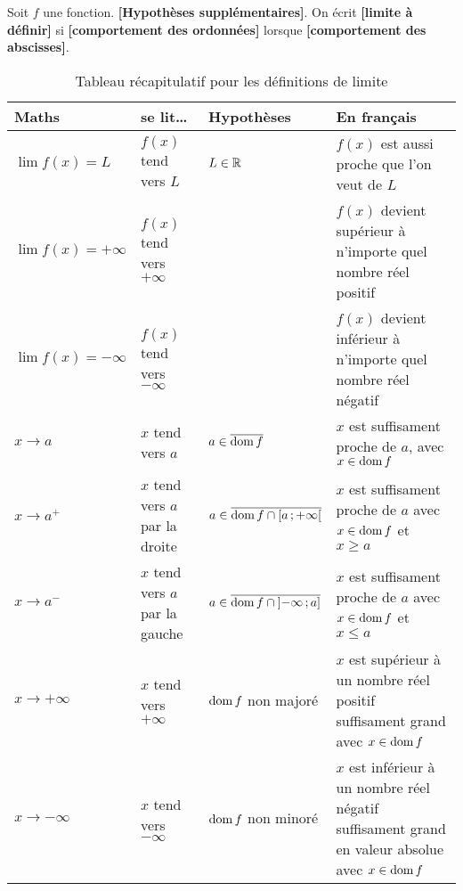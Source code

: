 \documentclass[main.tex]{subfiles}
\begin{document}
\begin{definition}
    [Limite]

    Soit $f$ une fonction.
    \textbf{[Hypothèses supplémentaires]}.
    On écrit \textbf{[limite à définir]}
    si \textbf{[comportement des ordonnées]}
    lorsque \textbf{[comportement des abscisses]}.
\end{definition}

\begin{sidewaystable}
    \centering
    \caption{Tableau récapitulatif pour les définitions de limite}
    \label{table:limit_definition}
    \begin{tabular}
        {l l l l}
        \toprule
        Maths & se lit\dots & Hypothèses & En français \\ \midrule
        $\lim f(x) = L$ & $f(x)$ tend vers $L$ & $L \in \mathbb{R}$ & $f(x)$ est aussi proche que l'on veut de $L$ \\
        $\lim f(x) = +\infty$ & $f(x)$ tend vers $+\infty$ & & $f(x)$ devient supérieur à n'importe quel nombre réel positif\\
        $\lim f(x) = -\infty$ & $f(x)$ tend vers $-\infty$ & & $f(x)$ devient inférieur à n'importe quel nombre réel négatif\\
        $x \to a$ & $x$ tend vers $a$ & $a \in \overline{\operatorname{dom} f}$ & $x$ est suffisament proche de $a$, avec $x \in \operatorname{dom} f$\\
        $x \to a^+$ & $x$ tend vers $a$ par la droite & $a \in \overline{\operatorname{dom} f \cap \mathopen{[}a\,;+\infty\mathclose{[}}$ & $x$ est suffisament proche de $a$ avec $x \in \operatorname{dom} f$ et $x \geq a$\\
        $x \to a^-$ & $x$ tend vers $a$ par la gauche & $a \in \overline{\operatorname{dom} f \cap \mathopen{]}-\infty\,;a\mathclose{]}}$ & $x$ est suffisament proche de $a$ avec $x \in \operatorname{dom} f$ et $x \leq a$\\
        $x \to +\infty$ & $x$ tend vers $+\infty$ & $\operatorname{dom} f$ non majoré & $x$ est supérieur à un nombre réel positif suffisament grand avec $x \in \operatorname{dom} f$\\
        $x \to -\infty$ & $x$ tend vers $-\infty$ & $\operatorname{dom} f$ non minoré & $x$ est inférieur à un nombre réel négatif suffisament grand en valeur absolue avec $x \in \operatorname{dom} f$\\
        \bottomrule
    \end{tabular}
\end{sidewaystable}
\end{document}
